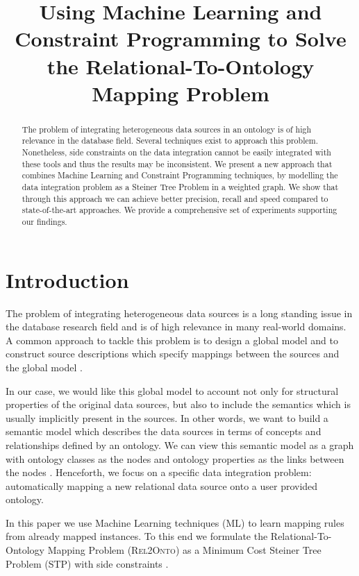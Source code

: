 \documentclass[letterpaper]{article} %
\newcommand{\relonto}{\textsc{Rel2Onto}}
\begin{document}
%
\title{Using Machine Learning and Constraint Programming to Solve the 
Relational-To-Ontology Mapping Problem}
\author{}
\maketitle
\begin{abstract}
The problem of integrating heterogeneous data sources in an ontology is of high 
relevance in the database field. Several techniques exist to approach this 
problem. Nonetheless, side constraints on the data integration cannot be easily 
integrated with these tools and thus the results may be inconsistent. We 
present a new approach that combines Machine Learning and 
Constraint Programming techniques, by modelling the data integration problem as 
a Steiner Tree Problem in a weighted graph. We show that through this approach 
we can achieve better precision, recall and speed compared to state-of-the-art 
approaches. We provide a comprehensive set of experiments supporting our 
findings.
\end{abstract}

\section{Introduction}
The problem of integrating heterogeneous data sources is a long standing issue 
in the database research field and is of high relevance in many real-world 
domains.
A common approach to tackle this problem is to design a global model and to
construct source descriptions which specify mappings between the sources and
the global model \cite{doan2012principles}.

In our case, we would like this global model to account
not only for structural properties of the original data sources, but also to 
include the semantics which is usually implicitly present in the sources. In 
other words, we want to build a semantic model which describes the data sources 
in terms of concepts and relationships defined by an ontology. We can view this
semantic model as a graph with ontology classes as the nodes and ontology
properties as the links between the nodes \cite{Taheriyan2013}. Henceforth, we 
focus on a specific data integration problem: automatically mapping a new 
relational data source onto a user provided ontology.

In this paper we use Machine Learning techniques (ML) to learn mapping rules 
from already mapped instances. To this end we formulate the 
Relational-To-Ontology Mapping Problem (\relonto{})
as a Minimum Cost Steiner Tree Problem (STP) with side constraints 
\cite{deuna2016steiner}.
\end{document}
